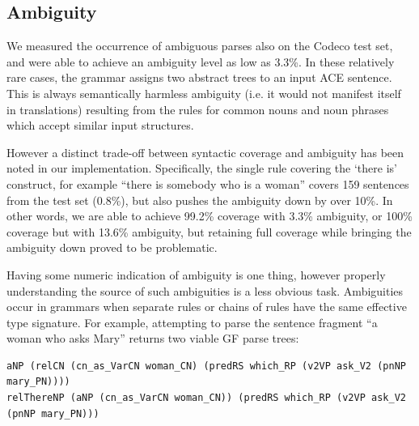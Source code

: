 \documentclass[a4paper]{article}
\begin{document}


\subsection{Ambiguity}
\label{subsection:ambiguity}

We measured the occurrence of ambiguous parses also on the Codeco test set,
and were able to achieve an ambiguity level as low as 3.3\%.
In these relatively rare cases, the grammar assigns two abstract trees
to an input ACE sentence. This is always semantically harmless ambiguity
(i.e. it would not manifest itself in translations) resulting from the rules
for common nouns and noun phrases which accept similar input structures.

However a distinct trade-off between syntactic coverage and ambiguity
has been noted in our implementation.  Specifically, the single rule
covering the `there is' construct, for example ``there is somebody
who is a woman'' covers 159 sentences from the test set (0.8\%), but
also pushes the ambiguity down by over 10\%. In other words, we are
able to achieve 99.2\% coverage with 3.3\% ambiguity, or 100\%
coverage but with 13.6\% ambiguity, but retaining full coverage while
bringing the ambiguity down proved to be problematic.


Having some numeric indication of ambiguity is one thing, however
properly understanding the source of such ambiguities is a less
obvious task. Ambiguities occur in grammars when separate rules or
chains of rules have the same effective type signature. For example,
attempting to parse the sentence fragment ``a woman who asks Mary''
returns two viable GF parse trees:

{\footnotesize
\begin{verbatim}
aNP (relCN (cn_as_VarCN woman_CN) (predRS which_RP (v2VP ask_V2 (pnNP mary_PN))))
relThereNP (aNP (cn_as_VarCN woman_CN)) (predRS which_RP (v2VP ask_V2 (pnNP mary_PN)))
\end{verbatim}
}
\end{document}
